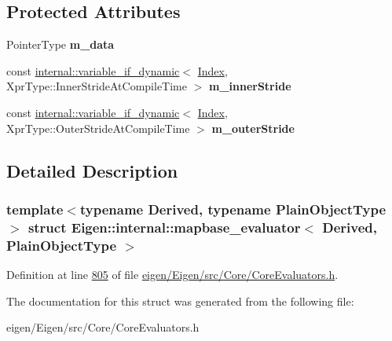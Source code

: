 \subsection*{Protected Attributes}
\begin{DoxyCompactItemize}
\item 
\mbox{\label{struct_eigen_1_1internal_1_1mapbase__evaluator_a1fd0a4a8d3565c6f4bd9783e10c01fd1}} 
Pointer\+Type {\bfseries m\+\_\+data}
\item 
\mbox{\label{struct_eigen_1_1internal_1_1mapbase__evaluator_a1c0111cac35152bb8c07999da6890214}} 
const \hyperlink{class_eigen_1_1internal_1_1variable__if__dynamic}{internal\+::variable\+\_\+if\+\_\+dynamic}$<$ \hyperlink{namespace_eigen_a62e77e0933482dafde8fe197d9a2cfde}{Index}, Xpr\+Type\+::\+Inner\+Stride\+At\+Compile\+Time $>$ {\bfseries m\+\_\+inner\+Stride}
\item 
\mbox{\label{struct_eigen_1_1internal_1_1mapbase__evaluator_a79eb3d91909a40951fa4fec473ceed8e}} 
const \hyperlink{class_eigen_1_1internal_1_1variable__if__dynamic}{internal\+::variable\+\_\+if\+\_\+dynamic}$<$ \hyperlink{namespace_eigen_a62e77e0933482dafde8fe197d9a2cfde}{Index}, Xpr\+Type\+::\+Outer\+Stride\+At\+Compile\+Time $>$ {\bfseries m\+\_\+outer\+Stride}
\end{DoxyCompactItemize}


\subsection{Detailed Description}
\subsubsection*{template$<$typename Derived, typename Plain\+Object\+Type$>$\newline
struct Eigen\+::internal\+::mapbase\+\_\+evaluator$<$ Derived, Plain\+Object\+Type $>$}



Definition at line \hyperlink{eigen_2_eigen_2src_2_core_2_core_evaluators_8h_source_l00805}{805} of file \hyperlink{eigen_2_eigen_2src_2_core_2_core_evaluators_8h_source}{eigen/\+Eigen/src/\+Core/\+Core\+Evaluators.\+h}.



The documentation for this struct was generated from the following file\+:\begin{DoxyCompactItemize}
\item 
eigen/\+Eigen/src/\+Core/\+Core\+Evaluators.\+h\end{DoxyCompactItemize}
